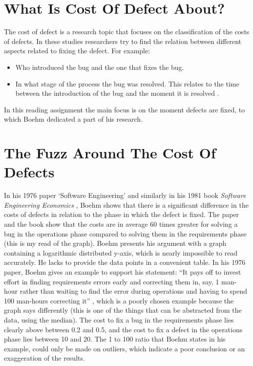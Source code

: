 \section*{What Is Cost Of Defect About?}

The cost of defect is a research topic that focuses on the classification of the costs of defects.
In these studies researchers try to find the relation between different aspects related to fixing the defect.
For example:
\begin{itemize}[noitemsep]
\item Who introduced the bug and the one that fixes the bug.
\item In what stage of the process the bug was resolved. This relates to the time between the introduction of the bug and the moment it is resolved \autocite{boehm1976software}.
\end{itemize}

In this reading assignment the main focus is on the moment defects are fixed, to which Boehm dedicated a part of his research.


\section*{The Fuzz Around The Cost Of Defects}

In his 1976 paper `Software Engineering' \autocite{boehm1976software} and similarly in his 1981 book \textit{Software Engineering Economics} \autocite{boehm1981software},
Boehm shows that there is a significant difference in the costs of defects in relation to the phase in which the defect is fixed.
The paper and the book show that the costs are in average 60 times greater for solving a bug in the operations phase compared to solving them in the requirements phase (this is my read of the graph).
Boehm presents his argument with a graph containing a logarithmic distributed y-axis, which is nearly impossible to read accurately.
He lacks to provide the data points in a convenient table.
In his 1976 paper, Boehm gives an example to support his statement:
``It pays off to invest effort in finding requirements errors early and
correcting them in, say, 1 man-hour rather than waiting to find the error during operations
and having to spend 100 man-hours correcting it'' \autocite[4]{boehm1976software}, which is a poorly chosen example because the graph says differently (this is one of the things that can be abstracted from the data, using the median).
The cost to fix a bug in the requirements phase lies clearly above between 0.2 and 0.5, and the cost to fix a defect in the operations phase lies between 10 and 20.
The 1 to 100 ratio that Boehm states in his example, could only be made on outliers, which indicate a poor conclusion or an exaggeration of the results.

